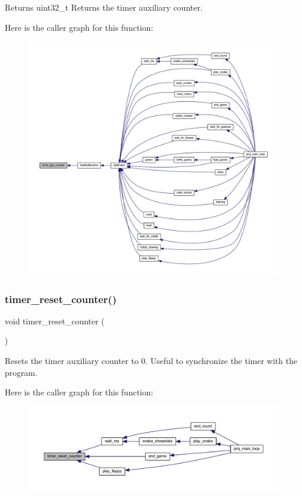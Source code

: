 \begin{DoxyReturn}{Returns}
uint32\+\_\+t Returns the timer auxiliary counter. 
\end{DoxyReturn}
Here is the caller graph for this function\+:\nopagebreak
\begin{figure}[H]
\begin{center}
\leavevmode
\includegraphics[width=350pt]{group__timer_ga2a20f5c67ca8817f632167d0a03467dd_icgraph}
\end{center}
\end{figure}
\mbox{\label{group__timer_ga47c90b12223cd6c7dc0cabf83d41ca54}} 
\subsubsection{\texorpdfstring{timer\+\_\+reset\+\_\+counter()}{timer\_reset\_counter()}}
{\footnotesize\ttfamily void timer\+\_\+reset\+\_\+counter (\begin{DoxyParamCaption}{ }\end{DoxyParamCaption})}



Resets the timer auxiliary counter to 0. Useful to synchronize the timer with the program. 

Here is the caller graph for this function\+:\nopagebreak
\begin{figure}[H]
\begin{center}
\leavevmode
\includegraphics[width=350pt]{group__timer_ga47c90b12223cd6c7dc0cabf83d41ca54_icgraph}
\end{center}
\end{figure}
